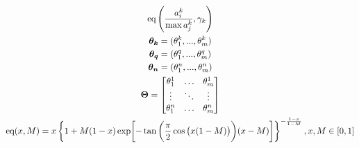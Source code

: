 \documentclass{article}
\begin{document}
\begin{gather}
    \text{eq}\left(
        \frac{
            a_{i}^{k}
        }{
            \max{a_{j}^{k}}
        },
        \gamma_{k}
    \right)\\
    \boldsymbol{\theta_{k}} = (\theta_{1}^{k}, ..., \theta_{m}^{k})\\
    \boldsymbol{\theta_{q}} = (\theta_{1}^{q}, ..., \theta_{m}^{q})\\
    \boldsymbol{\theta_{n}} = (\theta_{1}^{n}, ..., \theta_{m}^{n})\\
    \boldsymbol{\Theta} = 
    \begin{bmatrix}
        \theta_{1}^{1} & \hdots & \theta_{m}^{1}\\
        \vdots & \ddots & \vdots\\
        \theta_{1}^{n} & \hdots & \theta_{m}^{n}\\
    \end{bmatrix}\\
    \text{eq}(x,M) = 
    x\left\{
        1 + M (1 - x) \exp[-
            \tan \bigg(
                \frac{\pi}{2}
                \cos\big(
                    x (1 - M)
                \big)
            \bigg)
            (x - M)
         ]
    \right\} ^ {
        -\frac{
            1 - x
        }{
            1 - M
        }
    }, x, M \in [0,1]\\

\end{gather}
\end{document}
